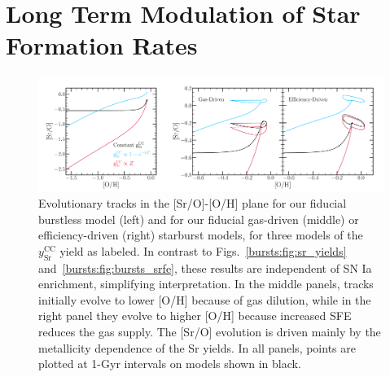 
\section{Long Term Modulation of Star Formation Rates}
\label{bursts:sec:oscillatory} 

\begin{figure} %
\includegraphics[scale = 0.32]{sro_bursts.pdf} 
\caption{
Evolutionary tracks in the [Sr/O]-[O/H] plane for our fiducial burstless 
model (left) and for our fiducial gas-driven (middle) or efficiency-driven 
(right) starburst models, for three models of the $y_\text{Sr}^\text{CC}$ yield 
as labeled. In contrast to Figs.~\ref{bursts:fig:sr_yields} and~\ref{bursts:fig:bursts_srfe}, 
these results are independent of SN Ia enrichment, simplifying interpretation. 
In the middle panels, tracks initially evolve to lower [O/H] because of gas 
dilution, while in the right panel they evolve to higher [O/H] because 
increased SFE reduces the gas supply. The [Sr/O] evolution is driven mainly by 
the metallicity dependence of the Sr yields. In all panels, 
points are plotted at 1-Gyr intervals on models shown in black. 
}
\label{bursts:fig:sro_bursts} 
\end{figure} 

